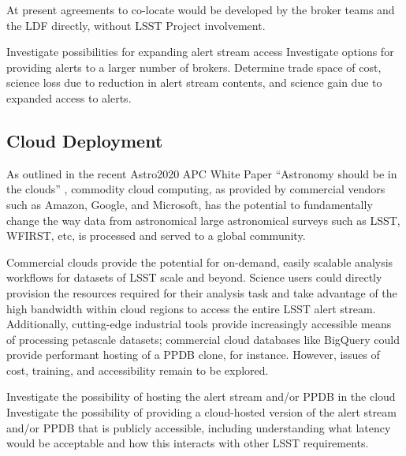 At present agreements to co-locate would be developed by the broker teams and the LDF directly, without LSST Project involvement.


{Investigate possibilities for expanding alert stream access}
{Investigate options for providing alerts to a larger number of brokers. 
Determine trade space of cost, science loss due to reduction in alert stream contents, and science gain due to expanded access to alerts.}

\subsection{Cloud Deployment}

As outlined in the  recent Astro2020 APC White Paper ``Astronomy should be in the clouds'' \cite{Smith:2019gqn}, commodity cloud computing, as provided by commercial vendors such as Amazon, Google, and Microsoft, has the potential to fundamentally change the way data from astronomical large astronomical surveys such as LSST, WFIRST, etc, is processed and served to a global community. 

Commercial clouds provide the potential for on-demand, easily scalable analysis workflows for datasets of LSST scale and beyond.  
Science users could directly provision the resources required for their analysis task and take advantage of the high bandwidth within cloud regions to access the entire LSST alert stream.  
Additionally, cutting-edge industrial tools provide increasingly accessible means of processing petascale datasets;
commercial cloud databases like BigQuery could provide performant hosting of a PPDB clone, for instance.
However, issues of cost, training, and accessibility remain to be explored.

{Investigate the possibility of hosting the alert stream and/or PPDB in the cloud}
{Investigate the possibility of providing a cloud-hosted version of the alert stream and/or PPDB that is publicly accessible, including understanding what latency would be acceptable and how  this interacts with other LSST requirements.}
